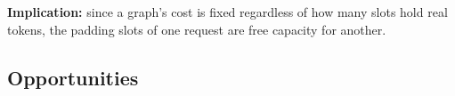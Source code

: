 \documentclass[sigconf,nonacm,10pt]{acmart}
\begin{document}
\noindent\textbf{Implication:} since a graph's cost is fixed regardless of how many slots hold real tokens, the padding slots of one request are free capacity for another.


\subsection{Opportunities}
\end{document}
